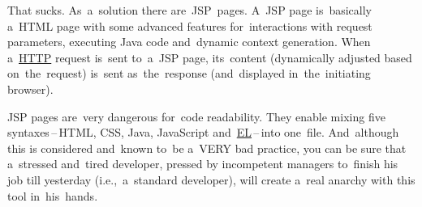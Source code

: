 \noindent That sucks. As~a~solution there are~JSP~pages. A~JSP page is~basically a~HTML page with some advanced features for~interactions with request parameters, executing Java code and~dynamic context generation. When a~\hyperref[http]{HTTP} request is~sent to~a~JSP page, its~content (dynamically adjusted based on~the~request) is~sent as~the~response (and~displayed in~the~initiating browser).

\warning JSP pages are~very dangerous for~code readability. They enable mixing five syntaxes\,--\,HTML, CSS, Java, JavaScript and~\hyperref[el]{EL}\,--\,into one~file. And~although this is considered and~known to~be a~VERY bad practice, you can be sure that a~stressed and~tired developer, pressed by incompetent managers to~finish his job till yesterday (i.e.,~a~standard developer), will create a~real anarchy with this tool in~his~hands.



\label{el}
